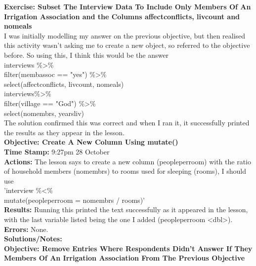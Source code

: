\documentclass{article}
\begin{document}
\begin{FlushLeft}
\vspace{5mm}
\textbf{Exercise: Subset The Interview Data To Include Only Members Of An Irrigation Association and the Columns affect\textunderscore conflicts, liv\textunderscore count and no\textunderscore meals}\\ 
I was initially modelling my answer on the previous objective, but then realised this activity wasn't asking me to create a new object, so referred to the objective before. So using this, I think this would be the answer\\
interviews \%\textgreater\%\\
filter(memb\textunderscore assoc == "yes") \%\textgreater\% \\
select(affect\textunderscore conflicts, liv\textunderscore count, no\textunderscore meals) \\
interviews\%\textgreater\% \\
filter(village == "God") \%\textgreater\% \\
select(no\textunderscore membrs, years\textunderscore liv)\\
The solution confirmed this was correct and when I ran it, it successfully printed the results as they appear in the lesson.\\
\vspace{5mm}
\textbf{Objective: Create A New Column Using mutate()}\\ 
\textbf{Time Stamp:} 9:27pm 28 October\\
\textbf{Actions:} The lesson says to create a new column (people\textunderscore per\textunderscore room) with the ratio of household members (no\textunderscore membrs) to rooms used for sleeping (rooms), I should use\\
'interview \%\textless\%\\
mutate(people\textunderscore per\textunderscore room = no\textunderscore membrs / rooms)'\\
\textbf{Results:} Running this printed the text successfully as it appeared in the lesson, with the last variable listed being the one I added (people\textunderscore per\textunderscore room \textless dbl\textgreater).\\
\textbf{Errors:} None.\\
\textbf{Solutions/Notes:}\\
\vspace{5mm}
\textbf{Objective: Remove Entries Where Respondents Didn't Answer If They Members Of An Irrigation Association From The Previous Objective}\\ 

\end{FlushLeft}
\end{document}

